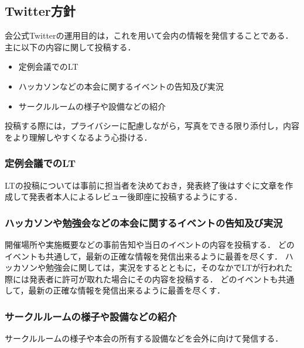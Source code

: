 \subsection*{Twitter方針}


会公式Twitterの運用目的は，これを用いて会内の情報を発信することである．主に以下の内容に関して投稿する．

\begin{itemize}
\item 定例会議でのLT
\item ハッカソンなどの本会に関するイベントの告知及び実況
\item サークルルームの様子や設備などの紹介
\end{itemize}

投稿する際には，プライバシーに配慮しながら，写真をできる限り添付し，内容をより理解しやすくなるよう心掛ける．

\subsubsection*{定例会議でのLT}
LTの投稿については事前に担当者を決めておき，発表終了後はすぐに文章を作成して発表者本人によるレビュー後即座に投稿するようにする．

\subsubsection*{ハッカソンや勉強会などの本会に関するイベントの告知及び実況}
開催場所や実施概要などの事前告知や当日のイベントの内容を投稿する．
どのイベントも共通して，最新の正確な情報を発信出来るように最善を尽くす．
ハッカソンや勉強会に関しては，実況をするとともに，そのなかでLTが行われた際には発表者に許可が取れた場合にその内容を投稿する．
どのイベントも共通して，最新の正確な情報を発信出来るように最善を尽くす．

\subsubsection*{サークルルームの様子や設備などの紹介}
サークルルームの様子や本会の所有する設備などを会外に向けて発信する．
